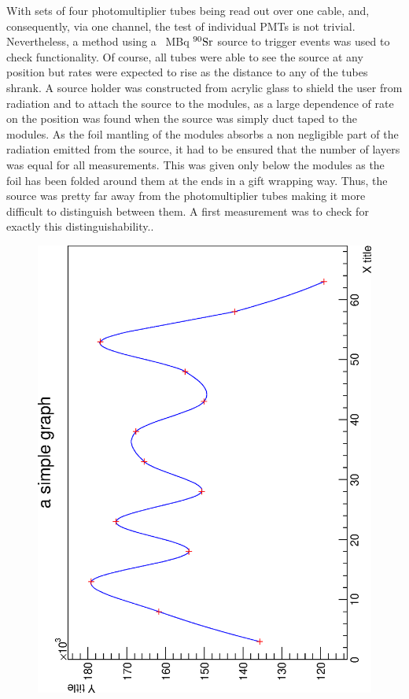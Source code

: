   With sets of four photomultiplier tubes being read out over one cable, and, consequently, via one channel, the test of individual PMTs is not trivial. Nevertheless, a method using a \SI{}{\mega\becquerel} $\rm ^{90}Sr$ source to trigger events was used to check functionality. Of course, all tubes were able to see the source at any position but rates were expected to rise as the distance to any of the tubes shrank. A source holder was constructed from acrylic glass to shield the user from radiation and to attach the source to the modules, as a large dependence of rate on the position was found when the source was simply duct taped to the modules. As the foil mantling of the modules absorbs a non negligible part of the radiation emitted from the source, it had to be ensured that the number of layers was equal for all measurements. This was given only below the modules as the foil has been folded around them at the ends in a gift wrapping way. Thus, the source was pretty far away from the photomultiplier 
  tubes making it more difficult to distinguish between them. A first measurement was to check for exactly this distinguishability..
  \begin{figure}
  	\includegraphics[angle = -90, width = 0.9 \textwidth]{graphics/cobalt/876_parallel_good.eps}
  	\caption[Rate scanning with cobalt source]{}
  \end{figure}

